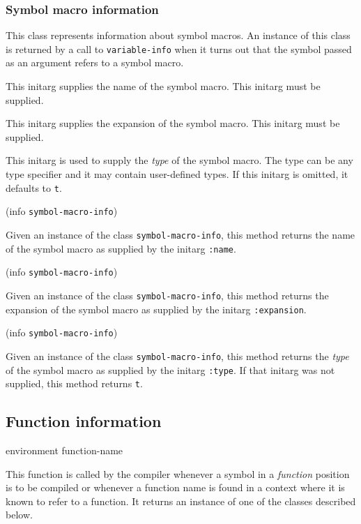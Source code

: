 \subsubsection{Symbol macro information}


This class represents information about symbol macros.  An
instance of this class is returned by a call to \texttt{variable-info}
when it turns out that the symbol passed as an argument refers to a
symbol macro.


This initarg supplies the name of the symbol macro.  This initarg must
be supplied.


This initarg supplies the expansion of the symbol macro.  This initarg
must be supplied.


This initarg is used to supply the \emph{type} of the symbol macro.
The type can be any type specifier and it may contain user-defined
types.  If this initarg is omitted, it defaults to \texttt{t}.

 {(info {\tt symbol-macro-info})}

Given an instance of the class \texttt{symbol-macro-info}, this method
returns the name of the symbol macro as supplied by the initarg
\texttt{:name}.

 {(info {\tt symbol-macro-info})}

Given an instance of the class \texttt{symbol-macro-info}, this method
returns the expansion of the symbol macro as supplied by the initarg
\texttt{:expansion}.

 {(info {\tt symbol-macro-info})}

Given an instance of the class \texttt{symbol-macro-info}, this method
returns the \emph{type} of the symbol macro as supplied by the initarg
\texttt{:type}.  If that initarg was not supplied, this method returns
\texttt{t}.

\subsection{Function information}

 {environment function-name}

This function is called by the compiler whenever a symbol in a
\emph{function} position is to be compiled or whenever a function name
is found in a context where it is known to refer to a function.  It
returns an instance of one of the classes described below.

